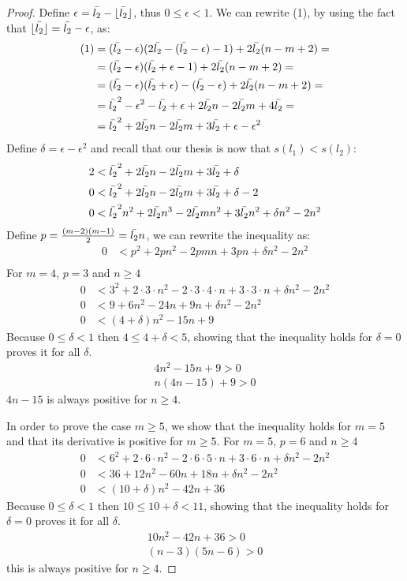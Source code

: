 \documentclass[version=3.21, pagesize, twoside=off, bibliography=totoc, DIV=calc, fontsize=12pt, a4paper]{scrartcl}
\begin{document}
\begin{proof}
	Define $\epsilon = \bar{l_2} - \lfloor\bar{l_2}\rfloor$, thus $0 ≤ \epsilon < 1$. We can rewrite (1), by using the fact that $\lfloor\bar{l_2}\rfloor = \bar{l_2} - \epsilon$, as:
	\begin{align}
		(1)&= (\bar{l_2}-\epsilon)(2\bar{l_2}-(\bar{l_2}-\epsilon)-1)+2\bar{l_2}(n-m+2)=\\
		&= (\bar{l_2}-\epsilon)(\bar{l_2}+\epsilon-1)+2\bar{l_2}(n-m+2)=\\
		&= (\bar{l_2}-\epsilon)(\bar{l_2}+\epsilon)-(\bar{l_2}-\epsilon)+2\bar{l_2}(n-m+2)=\\
		&= \bar{l_2}^2-\epsilon^2-\bar{l_2}+\epsilon+2\bar{l_2} n-2\bar{l_2} m+4\bar{l_2}=\\
		&= \bar{l_2}^2+2\bar{l_2} n-2\bar{l_2} m+3\bar{l_2}+\epsilon-\epsilon^2\\
	\end{align}
	\hfuzz=4cm
	Define $\delta=\epsilon-\epsilon^2$ and recall that our thesis is now that $s(l_1)<s(l_2)$:
	\begin{align}
		2&< \bar{l_2}^2+2\bar{l_2} n-2\bar{l_2} m+3\bar{l_2}+\delta\\
		0&< \bar{l_2}^2+2\bar{l_2} n-2\bar{l_2} m+3\bar{l_2}+\delta-2\\
		0&< \bar{l_2}^2 n^2+2\bar{l_2} n^3-2\bar{l_2} m n^2+3\bar{l_2} n^2+\delta n^2-2 n^2\\
	\end{align}
	Define $p=\frac{(m-2)(m-1)}{2}=\bar{l_2} n$, we can rewrite the inequality as: 
	\begin{align}
		0&< p^2+2p n^2-2p m n+3p n+\delta n^2-2 n^2\\
	\end{align}
	For $m=4$, $p=3$ and $n\geq4$
	\begin{align}
		0&< 3^2+2 \cdot 3 \cdot n^2-2 \cdot 3 \cdot 4 \cdot n+3 \cdot 3 \cdot n+\delta n^2-2 n^2\\
		0&< 9+6 n^2-24 n+9n+ \delta n^2-2 n^2 \\
		0&<(4+\delta)n^2-15n+9
	\end{align}
	Because $0 \leq \delta < 1$ then $4 \leq 4+\delta < 5$, showing that the inequality holds for $\delta=0$  proves it for all $\delta$.
	\begin{align}
		4n^2-15n+9>0 \\
		n(4n-15)+9>0 
	\end{align}
	$4n-15$ is always positive for $n\geq4$. 
	
	In order to prove the case $m\geq5$, we show that the inequality holds for $m=5$ and that its derivative is positive for $m\geq5$.
	For $m=5$, $p=6$ and $n\geq4$
	\begin{align}
		0&< 6^2+2 \cdot 6 \cdot n^2-2 \cdot 6 \cdot 5 \cdot n+3 \cdot 6 \cdot n+\delta n^2-2 n^2\\
		0&< 36+12 n^2-60 n+18n+ \delta n^2-2 n^2 \\
		0&<(10+\delta)n^2-42n+36
	\end{align}
	Because $0 \leq \delta < 1$ then $10 \leq 10+\delta < 11$, showing that the inequality holds for $\delta=0$ proves it for all $\delta$.
	\begin{align}
		10n^2-42n+36>0 \\
		(n - 3) (5n - 6)>0
	\end{align}
	this is always positive for $n\geq4$.
	

\end{proof}
\end{document}
